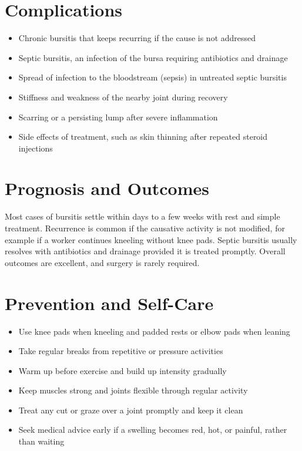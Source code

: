 \section*{Complications}
\begin{itemize}
    \item Chronic bursitis that keeps recurring if the cause is not addressed
    \item Septic bursitis, an infection of the bursa requiring antibiotics and drainage
    \item Spread of infection to the bloodstream (sepsis) in untreated septic bursitis
    \item Stiffness and weakness of the nearby joint during recovery
    \item Scarring or a persisting lump after severe inflammation
    \item Side effects of treatment, such as skin thinning after repeated steroid injections
\end{itemize}

\section*{Prognosis and Outcomes}
Most cases of bursitis settle within days to a few weeks with rest and simple treatment. Recurrence is common if the causative activity is not modified, for example if a worker continues kneeling without knee pads. Septic bursitis usually resolves with antibiotics and drainage provided it is treated promptly. Overall outcomes are excellent, and surgery is rarely required.

\section*{Prevention and Self-Care}
\begin{itemize}
    \item Use knee pads when kneeling and padded rests or elbow pads when leaning
    \item Take regular breaks from repetitive or pressure activities
    \item Warm up before exercise and build up intensity gradually
    \item Keep muscles strong and joints flexible through regular activity
    \item Treat any cut or graze over a joint promptly and keep it clean
    \item Seek medical advice early if a swelling becomes red, hot, or painful, rather than waiting
\end{itemize}

